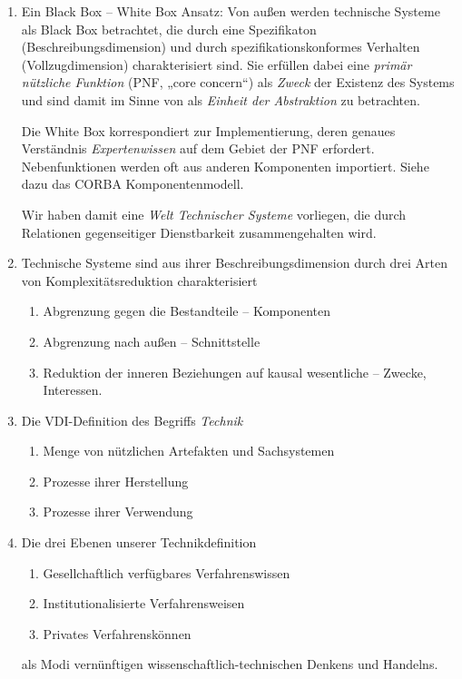 \documentclass[11pt,a4paper]{article}
\begin{document}
\begin{enumerate}
\item Ein Black Box -- White Box Ansatz: Von außen werden technische Systeme
  als Black Box betrachtet, die durch eine Spezifikaton
  (Beschreibungsdimension) und durch spezifikationskonformes Verhalten
  (Vollzugdimension) charakterisiert sind. Sie erfüllen dabei eine
  \emph{primär nützliche Funktion} (PNF, „core concern“) als \emph{Zweck} der
  Existenz des Systems und sind damit im Sinne von \cite{Szyperski2002} als
  \emph{Einheit der Abstraktion} zu betrachten.

  Die White Box korrespondiert zur Implementierung, deren genaues Verständnis
  \emph{Expertenwissen} auf dem Gebiet der PNF erfordert.  Nebenfunktionen
  werden oft aus anderen Komponenten importiert. Siehe dazu das CORBA
  Komponentenmodell.

  Wir haben damit eine \emph{Welt Technischer Systeme} vorliegen, die durch
  Relationen gegenseitiger Dienstbarkeit zusammengehalten wird.
\item Technische Systeme sind aus ihrer Beschreibungsdimension durch drei
  Arten von Komplexitätsreduktion charakterisiert
\begin{enumerate}[noitemsep]
\item Abgrenzung gegen die Bestandteile -- Komponenten
\item Abgrenzung nach außen -- Schnittstelle
\item Reduktion der inneren Beziehungen auf kausal wesentliche -- Zwecke,
  Interessen.
\end{enumerate}
\item Die VDI-Definition des Begriffs \emph{Technik}
\begin{enumerate}[noitemsep]
\item Menge von nützlichen Artefakten und Sachsystemen
\item Prozesse ihrer Herstellung
\item Prozesse ihrer Verwendung
\end{enumerate}
\item Die drei Ebenen unserer Technikdefinition
\begin{enumerate}[noitemsep]
\item Gesellchaftlich verfügbares Verfahrenswissen
\item Institutionalisierte Verfahrensweisen
\item Privates Verfahrenskönnen
\end{enumerate}
als Modi vernünftigen wissenschaftlich-technischen Denkens und Handelns.
\end{enumerate}
\end{document}

